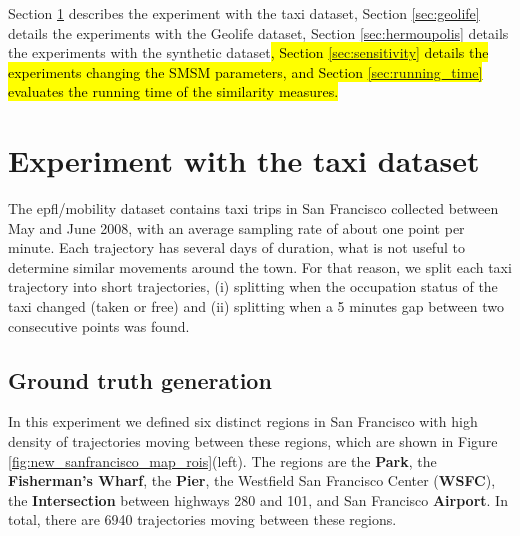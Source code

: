 Section \ref{sec:new_crawdad} describes the experiment with the {taxi} dataset, Section \ref{sec:geolife} details the experiments with the Geolife dataset, Section \ref{sec:hermoupolis} details the experiments with the synthetic dataset\hl{, Section {\ref{sec:sensitivity}} details the experiments changing the SMSM parameters, and Section {\ref{sec:running_time}} evaluates the running time of the similarity measures.}

\section{Experiment with the taxi dataset}\label{sec:new_crawdad}

{The epfl/mobility dataset contains taxi trips in San Francisco collected between May and June 2008, with an average sampling rate of about one point per minute. Each trajectory has several days of duration, what is not useful to determine similar movements around the town. For that reason, we split each taxi trajectory into short trajectories, (i) splitting when the occupation status of the taxi changed (taken or free) and (ii) splitting when a 5 minutes gap between two consecutive points was found.}

\subsection{Ground truth generation}
{In this experiment we defined six distinct regions in San Francisco with high density of trajectories moving between these regions, which are shown in Figure {\ref{fig:new_sanfrancisco_map_rois}}(left). The regions are the \textbf{Park}, the \textbf{Fisherman's Wharf}, the \textbf{Pier}, the Westfield San Francisco Center (\textbf{WSFC}), the \textbf{Intersection} between highways 280 and 101, and San Francisco \textbf{Airport}. In total, there are 6940 trajectories moving between these regions.}

